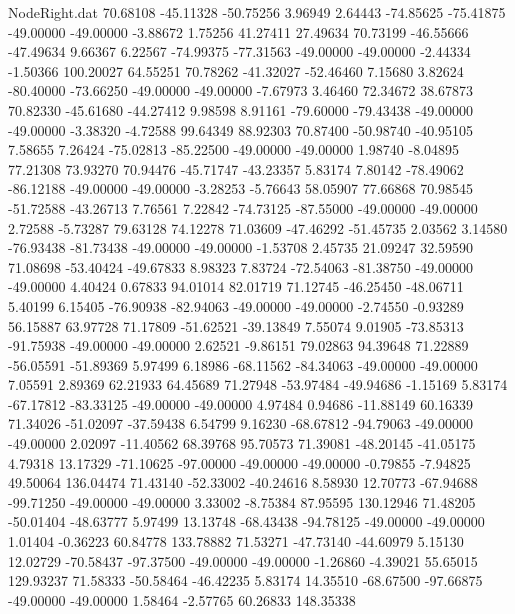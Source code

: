\begin{filecontents}{NodeRight.dat}
  70.68108  -45.11328  -50.75256     3.96949    2.64443  -74.85625  -75.41875  -49.00000  -49.00000   -3.88672    1.75256   41.27411   27.49634
  70.73199  -46.55666  -47.49634     9.66367    6.22567  -74.99375  -77.31563  -49.00000  -49.00000   -2.44334   -1.50366  100.20027   64.55251
  70.78262  -41.32027  -52.46460     7.15680    3.82624  -80.40000  -73.66250  -49.00000  -49.00000   -7.67973    3.46460   72.34672   38.67873
  70.82330  -45.61680  -44.27412     9.98598    8.91161  -79.60000  -79.43438  -49.00000  -49.00000   -3.38320   -4.72588   99.64349   88.92303
  70.87400  -50.98740  -40.95105     7.58655    7.26424  -75.02813  -85.22500  -49.00000  -49.00000    1.98740   -8.04895   77.21308   73.93270
  70.94476  -45.71747  -43.23357     5.83174    7.80142  -78.49062  -86.12188  -49.00000  -49.00000   -3.28253   -5.76643   58.05907   77.66868
  70.98545  -51.72588  -43.26713     7.76561    7.22842  -74.73125  -87.55000  -49.00000  -49.00000    2.72588   -5.73287   79.63128   74.12278
  71.03609  -47.46292  -51.45735     2.03562    3.14580  -76.93438  -81.73438  -49.00000  -49.00000   -1.53708    2.45735   21.09247   32.59590
  71.08698  -53.40424  -49.67833     8.98323    7.83724  -72.54063  -81.38750  -49.00000  -49.00000    4.40424    0.67833   94.01014   82.01719
  71.12745  -46.25450  -48.06711     5.40199    6.15405  -76.90938  -82.94063  -49.00000  -49.00000   -2.74550   -0.93289   56.15887   63.97728
  71.17809  -51.62521  -39.13849     7.55074    9.01905  -73.85313  -91.75938  -49.00000  -49.00000    2.62521   -9.86151   79.02863   94.39648
  71.22889  -56.05591  -51.89369     5.97499    6.18986  -68.11562  -84.34063  -49.00000  -49.00000    7.05591    2.89369   62.21933   64.45689
  71.27948  -53.97484  -49.94686    -1.15169    5.83174  -67.17812  -83.33125  -49.00000  -49.00000    4.97484    0.94686  -11.88149   60.16339
  71.34026  -51.02097  -37.59438     6.54799    9.16230  -68.67812  -94.79063  -49.00000  -49.00000    2.02097  -11.40562   68.39768   95.70573
  71.39081  -48.20145  -41.05175     4.79318   13.17329  -71.10625  -97.00000  -49.00000  -49.00000   -0.79855   -7.94825   49.50064  136.04474
  71.43140  -52.33002  -40.24616     8.58930   12.70773  -67.94688  -99.71250  -49.00000  -49.00000    3.33002   -8.75384   87.95595  130.12946
  71.48205  -50.01404  -48.63777     5.97499   13.13748  -68.43438  -94.78125  -49.00000  -49.00000    1.01404   -0.36223   60.84778  133.78882
  71.53271  -47.73140  -44.60979     5.15130   12.02729  -70.58437  -97.37500  -49.00000  -49.00000   -1.26860   -4.39021   55.65015  129.93237
  71.58333  -50.58464  -46.42235     5.83174   14.35510  -68.67500  -97.66875  -49.00000  -49.00000    1.58464   -2.57765   60.26833  148.35338

\end{filecontents}
